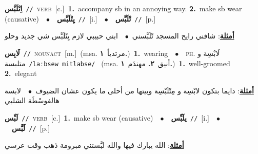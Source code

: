 \documentclass[10pt,a4paper,twoside]{article} %
\begin{document}
\begin{multicols}{2}
{{{{{{{{\setlength\topsep{0pt}\textbf{\foreignlanguage{arabic}{اِتْلَبَّس}}\ {\color{gray}\texttt{//}\color{black}}\ \textsc{verb}\ [c.]\ \textbf{1.}~accompany sb in an annoying way.  \textbf{2.}~make sb wear (causative)\ \ $\bullet$\ \ \setlength\topsep{0pt}\textbf{\foreignlanguage{arabic}{يِتْلَبَّس}}\ {\color{gray}\texttt{//}\color{black}}\ [i.]\ \ $\bullet$\ \ \setlength\topsep{0pt}\textbf{\foreignlanguage{arabic}{تْلَبَّس}}\ {\color{gray}\texttt{//}\color{black}}\ [p.]\  \begin{flushright}\color{gray}\foreignlanguage{arabic}{\textbf{\underline{\foreignlanguage{arabic}{أمثلة}}}: شافني رايح المسجد تْلَبَّسني\ $\bullet$\ \  ابني حبيبي لازم يِتْلَبَّس شي جديد وحلو}\end{flushright}\color{black}} \vspace{2mm}

{\setlength\topsep{0pt}\textbf{\foreignlanguage{arabic}{لَابِس}}\ {\color{gray}\texttt{//}\color{black}}\ \textsc{noun\textunderscore act}\ [m.]\ \color{gray}(msa. \foreignlanguage{arabic}{مرتدياً}~\foreignlanguage{arabic}{\textbf{١.}})\color{black}\ \textbf{1.}~wearing\ \ $\bullet$\ \ \textsc{ph.} \color{gray} \foreignlanguage{arabic}{لَابْسِة و متلبسة}\color{black}\ {\color{gray}\texttt{/{\sffamily laːbsew mitlabse}/}\color{black}}\ \color{gray} (msa. \foreignlanguage{arabic}{أنيق}~\foreignlanguage{arabic}{\textbf{٢.}}  \foreignlanguage{arabic}{مهندَم}~\foreignlanguage{arabic}{\textbf{١.}})\color{black}\ \textbf{1.}~well-groomed  \textbf{2.}~elegant\  \begin{flushright}\color{gray}\foreignlanguage{arabic}{\textbf{\underline{\foreignlanguage{arabic}{أمثلة}}}: دايما بتكون لابْسِة و مِتْلَبْسِة وبيتها من أحلى ما يكون عشان الضيوف\ $\bullet$\ \  لابسة هالفوسْطَة الشلبي}\end{flushright}\color{black}} \vspace{2mm}

{\setlength\topsep{0pt}\textbf{\foreignlanguage{arabic}{لَبِّس}}\ {\color{gray}\texttt{//}\color{black}}\ \textsc{verb}\ [c.]\ \textbf{1.}~make sb wear (causative)\ \ $\bullet$\ \ \setlength\topsep{0pt}\textbf{\foreignlanguage{arabic}{يلَبِّس}}\ {\color{gray}\texttt{//}\color{black}}\ [i.]\ \ $\bullet$\ \ \setlength\topsep{0pt}\textbf{\foreignlanguage{arabic}{لَبَّس}}\ {\color{gray}\texttt{//}\color{black}}\ [p.]\  \begin{flushright}\color{gray}\foreignlanguage{arabic}{\textbf{\underline{\foreignlanguage{arabic}{أمثلة}}}: الله يبارك فيها والله لبَّستني مبرومة ذهب وقت عرسي}\end{flushright}\color{black}} \vspace{2mm}

}}}}}}}
\end{multicols}
\end{document}
